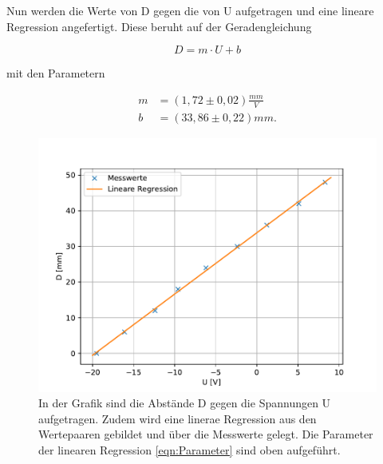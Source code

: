 \documentclass[titlepage = firstcover]{scrartcl}
\begin{document}
        \noindent Nun werden die Werte von D gegen die von U aufgetragen und eine lineare Regression angefertigt. Diese beruht auf der Geradengleichung

        \begin{equation*}
            D = m\cdot U + b
        \end{equation*}

        \noindent mit den Parametern

        \begin{align}
            m &= (1,72 \pm 0,02) \frac{mm}{V} \\
            b &= (33,86 \pm 0,22) mm.
            \label{eqn:Parameter}
        \end{align}

        \begin{figure}
            \includegraphics{UD_plot.pdf}
            \caption{In der Grafik sind die Abstände D gegen die Spannungen U aufgetragen. Zudem wird eine linerae Regression aus den Wertepaaren gebildet und über die Messwerte gelegt. Die Parameter der linearen Regression \ref{eqn:Parameter} sind oben aufgeführt.}
            \label{fig:Graf}
        \end{figure}
\end{document}
